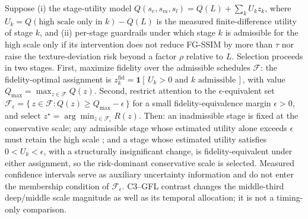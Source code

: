 \documentclass[times,twocolumn,final]{elsarticle}
\providecommand{\DIFadd}[1]{{\protect\color{blue} \sf #1}} %
\providecommand{\DIFdel}[1]{{\protect\color{red} \scriptsize #1}} %
\providecommand{\DIFaddbegin}{} %
\providecommand{\DIFaddend}{} %
\providecommand{\DIFdelend}{} %
\begin{document}
\DIFdel{Suppose (i) the stage-utility model $Q(s_e,s_m,s_l)=Q(L)+\sum_{k}U_k z_k$, where $U_k=Q(\text{high scale only in }k)-Q(L)$ is the measured finite-difference utility of stage $k$, and (ii) per-stage guardrails under which stage $k$ is admissible for the high scale only if its intervention does not reduce FG-SSIM by more than $\tau$ nor raise the texture-deviation risk beyond a factor $\rho$ relative to $L$. Selection proceeds in two stages. First, maximize fidelity over the admissible schedules $\mathcal{F}$: the fidelity-optimal assignment is $z_k^{\mathrm{fid}}=\mathbf{1}[\,U_k>0 \text{ and } k \text{ admissible}\,]$, with value $Q_{\max}=\max_{z\in\mathcal{F}}Q(z)$. Second, restrict attention to the $\epsilon$-equivalent set $\mathcal{F}_\epsilon=\{\,z\in\mathcal{F}: Q(z)\ge Q_{\max}-\epsilon\,\}$ for a small fidelity-equivalence margin $\epsilon>0$, and select $z^{\star}=\arg\min_{z\in\mathcal{F}_\epsilon}R(z)$. Then: an inadmissible stage is fixed at the conservative scale; any admissible stage whose estimated utility alone exceeds $\epsilon$ must retain the high scale ; and a stage whose estimated utility satisfies $0<U_k<\epsilon$, with a structurally insignificant change, is fidelity-equivalent under either assignment, so the risk-dominant conservative scale is selected. Measured confidence intervals serve as auxiliary uncertainty information and do not enter the membership condition of $\mathcal{F}_\epsilon$.
}%
\DIFdelend \DIFaddbegin \DIFadd{C3--GFL contrast changes the middle-third deep/middle scale magnitude as well as its temporal allocation; it is not a timing-only comparison.
}\DIFaddend 
\end{document}
